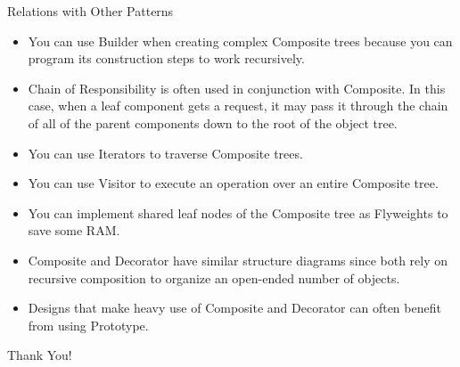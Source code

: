 \documentclass[13pt]{beamer}
\begin{document}
\begin{frame}{Relations with Other Patterns}
	\begin{itemize}
		\item You can use Builder when creating complex Composite trees because you can program its construction steps to work recursively.
		\item Chain of Responsibility is often used in conjunction with Composite. In this case, when a leaf component gets a request, it may pass it through the chain of all of the parent components down to the root of the object tree.
		\item You can use Iterators to traverse Composite trees.
		\item You can use Visitor to execute an operation over an entire Composite tree.
		\item You can implement shared leaf nodes of the Composite tree as Flyweights to save some RAM.
		\item Composite and Decorator have similar structure diagrams since both rely on recursive composition to organize an open-ended number of objects.
		
		\item Designs that make heavy use of Composite and Decorator can often benefit from using Prototype.
	\end{itemize}
\end{frame}

\begin{frame}
\begin{center}
{\fontsize{40}{50}\selectfont Thank You!}
\end{center}
\end{frame}
\end{document}

